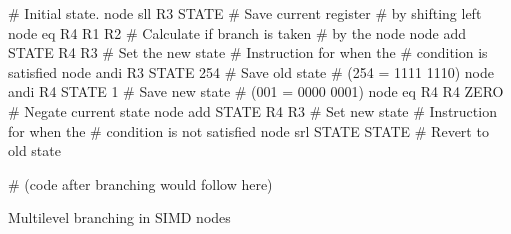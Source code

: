 \begin{listing}[h]
  \centering
  \begin{lenacode}
    # Initial state.
    node sll R3 STATE      # Save current register
                           # by shifting left
    node eq R4 R1 R2       # Calculate if branch is taken
                           # by the node
    node add STATE R4 R3   # Set the new state
      # Instruction for when the 
      # condition is satisfied
    node andi R3 STATE 254 # Save old state
                           # (254 = 1111 1110)
    node andi R4 STATE 1   # Save new state
                           # (001 = 0000 0001)
    node eq R4 R4 ZERO     # Negate current state
    node add STATE R4 R3   # Set new state
      # Instruction for when the 
      # condition is not satisfied
    node srl STATE STATE   # Revert to old state

    # (code after branching would follow here)
  \end{lenacode}
  \caption[Multilevel branching]{Multilevel branching in SIMD nodes}
  \label{lst:multilevel-branching}
\end{listing}
